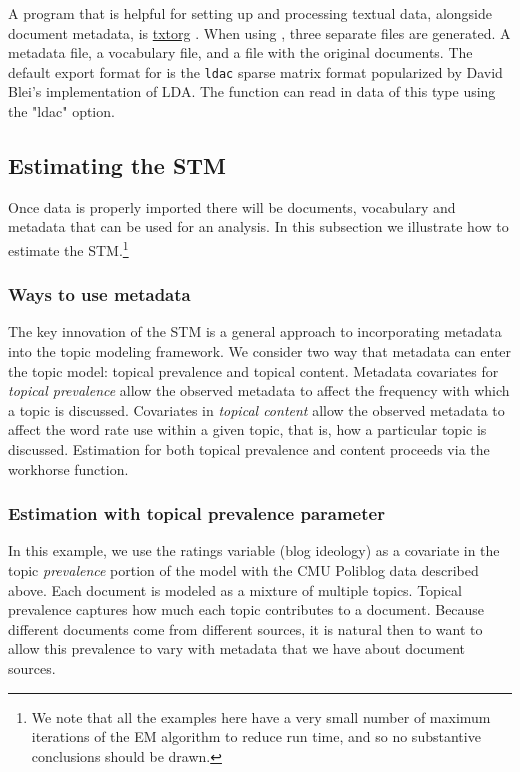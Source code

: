 \documentclass[nojss]{jss}
\begin{document}
A program that is helpful for setting up and processing textual data, alongside document metadata, is \href{www.txtorg.org}{txtorg} \citep{TextComparative}. When using , three separate files are generated. A metadata file, a vocabulary file, and a file with the original documents. The default export format for  is the \texttt{ldac} sparse matrix format popularized by David Blei's implementation of LDA.  The  function can read in data of this type using the "ldac" option.

\subsection{Estimating the STM}

Once data is properly imported there will be documents, vocabulary and metadata that can be used for an analysis. In this subsection we illustrate how to estimate the STM.\footnote{We note that all the examples here have a very small number of maximum iterations of the EM algorithm to reduce run time, and so no substantive conclusions should be drawn.}

\subsubsection{Ways to use metadata}

The key innovation of the STM is a general approach to incorporating metadata into the topic modeling framework.  We consider two way that metadata can enter the topic model: topical prevalence and topical content.  Metadata covariates for \emph{topical prevalence} allow the observed metadata to affect the frequency with which a topic is discussed.  Covariates in \emph{topical content} allow the observed metadata to affect the word rate use within a given topic, that is, how a particular topic is discussed. Estimation for both topical prevalence and content proceeds via the workhorse  function.

\subsubsection{Estimation with topical prevalence parameter}

In this example, we use the ratings variable (blog ideology) as a covariate in the topic \emph{prevalence} portion of the model with the CMU Poliblog data described above. Each document is modeled as a mixture of multiple topics. Topical prevalence captures how much each topic contributes to a document. Because different documents come from different sources, it is natural then to want to allow this prevalence to vary with metadata that we have about document sources.
\end{document}
